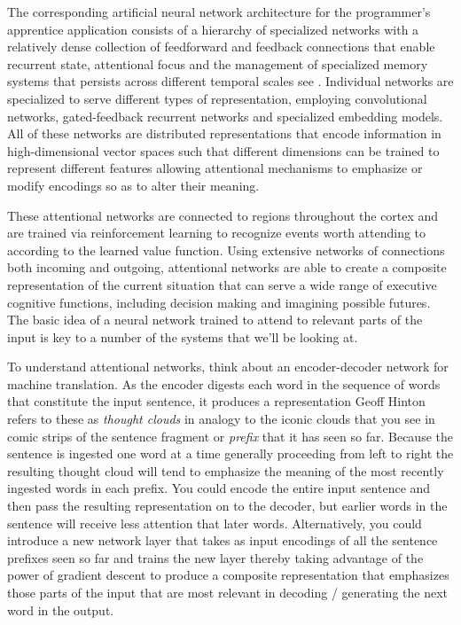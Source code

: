 The corresponding artificial neural network architecture for the programmer's apprentice application consists of a hierarchy of specialized networks with a relatively dense collection of feedforward and feedback connections that enable recurrent state, attentional focus and the management of specialized memory systems that persists across different temporal scales \emdash{} see {{}}. Individual networks are specialized to serve different types of representation, employing convolutional networks, gated-feedback recurrent networks and specialized embedding models. All of these networks are distributed representations that encode information in high-dimensional vector spaces such that different dimensions can be trained to represent different features allowing attentional mechanisms to emphasize or modify encodings so as to alter their meaning.

These attentional networks are connected to regions throughout the cortex and are trained via reinforcement learning to recognize events worth attending to according to the learned value function. Using extensive networks of connections \emdash{} both incoming and outgoing, attentional networks are able to create a composite representation of the current situation that can serve a wide range of executive cognitive functions, including decision making and imagining possible futures. The basic idea of a neural network trained to attend to relevant parts of the input is key to a number of the systems that we'll be looking at.

To understand attentional networks, think about an encoder-decoder network for machine translation. As the encoder digests each word in the sequence of words that constitute the input sentence, it produces a representation \emdash{} Geoff Hinton refers to these as {\it{thought clouds}} in analogy to the iconic clouds that you see in comic strips \emdash{} of the sentence fragment or {\it{prefix}} that it has seen so far. Because the sentence is ingested one word at a time \emdash{} generally proceeding from left to right \emdash{} the resulting thought cloud will tend to emphasize the meaning of the most recently ingested words in each prefix. You could encode the entire input sentence and then pass the resulting representation on to the decoder, but earlier words in the sentence will receive less attention that later words. Alternatively, you could introduce a new network layer that takes as input encodings of all the sentence prefixes seen so far and trains the new layer \emdash{} thereby taking advantage of the power of gradient descent \emdash{} to produce a composite representation that emphasizes those parts of the input that are most relevant in decoding / generating the next word in the output.

